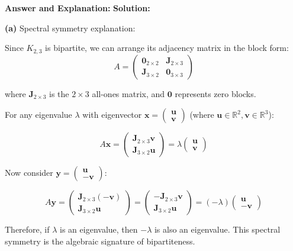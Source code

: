 \documentclass[11pt]{article}
\newenvironment{answer}{\color{answercolor}\begin{framed}\textbf{Answer and Explanation:}}{\end{framed}}
\begin{document}
\begin{answer}
\textbf{Solution:}

\textbf{(a)} Spectral symmetry explanation:

Since $K_{2,3}$ is bipartite, we can arrange its adjacency matrix in the block form:
$$A = \begin{pmatrix}
\mathbf{0}_{2 \times 2} & \mathbf{J}_{2 \times 3} \\
\mathbf{J}_{3 \times 2} & \mathbf{0}_{3 \times 3}
\end{pmatrix}$$

where $\mathbf{J}_{2 \times 3}$ is the $2 \times 3$ all-ones matrix, and $\mathbf{0}$ represents zero blocks.

For any eigenvalue $\lambda$ with eigenvector $\mathbf{x} = \begin{pmatrix} \mathbf{u} \\ \mathbf{v} \end{pmatrix}$ (where $\mathbf{u} \in \mathbb{R}^2, \mathbf{v} \in \mathbb{R}^3$):

$$A\mathbf{x} = \begin{pmatrix} \mathbf{J}_{2 \times 3}\mathbf{v} \\ \mathbf{J}_{3 \times 2}\mathbf{u} \end{pmatrix} = \lambda \begin{pmatrix} \mathbf{u} \\ \mathbf{v} \end{pmatrix}$$

Now consider $\mathbf{y} = \begin{pmatrix} \mathbf{u} \\ -\mathbf{v} \end{pmatrix}$:

$$A\mathbf{y} = \begin{pmatrix} \mathbf{J}_{2 \times 3}(-\mathbf{v}) \\ \mathbf{J}_{3 \times 2}\mathbf{u} \end{pmatrix} = \begin{pmatrix} -\mathbf{J}_{2 \times 3}\mathbf{v} \\ \mathbf{J}_{3 \times 2}\mathbf{u} \end{pmatrix} = (-\lambda) \begin{pmatrix} \mathbf{u} \\ -\mathbf{v} \end{pmatrix}$$

Therefore, if $\lambda$ is an eigenvalue, then $-\lambda$ is also an eigenvalue. This spectral symmetry is the algebraic signature of bipartiteness.


\end{answer}
\end{document}
